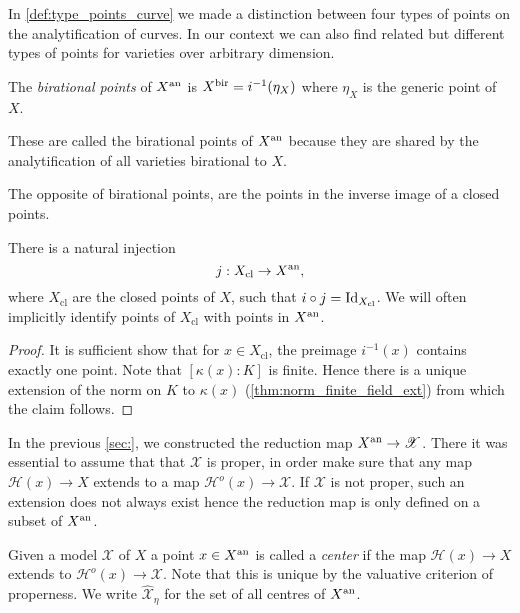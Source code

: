 In \cref{def:type_points_curve} we made a distinction between four types of points on the analytification of curves. 
In our context we can also find related but different types of points for varieties over arbitrary dimension. 

\begin{definition}
	The \emph{birational points} of $X{}^{\text{an}}$ is  $X{}^{\text{bir}} = i ^{-1}(\eta_X)$ where $\eta_X$ is the generic point of $X$. 
\end{definition}
These are called the birational points of $X{}^{\text{an}}$ because they are shared by the analytification of all varieties birational to $X$.

The opposite of birational points, are the points in the inverse image of a closed points. 
\begin{lemma}
	There is a natural injection \[
		j: X_\text{cl}  \to X{}^{\text{an}} 
	,\] 
	where $X_\text{cl} $ are the closed points of $X$, such that $i \circ j = \operatorname{Id} _{X_\text{cl} }$. 
	We will often implicitly identify points of $X_\text{cl} $ with points in $X{}^{\text{an}}$. 
\end{lemma}
\begin{proof}
	It is sufficient show that for $x \in X_\text{cl} $, the preimage $i^{-1}(x)$ contains exactly one point. 
	Note that $[\kappa(x):K]$ is finite. 
	Hence there is a unique extension of the norm on $K$ to $\kappa(x)$ (\cref{thm:norm_finite_field_ext}) from which the claim follows. 
\end{proof}

In the previous \cref{sec:}, we constructed the reduction map $X{}^{\text{an}} \to \mathscr X$. 
There it was essential to assume that that $\mathscr X$ is proper, in order make sure that any map $\mathcal{H} (x) \to X$ extends to a map $\mathcal{H} ^{o}(x) \to \mathscr X$. 
If $\mathscr X$ is not proper, such an extension does not always exist hence the reduction map is only defined on a subset of $X{}^{\text{an}}$. 
\begin{definition}
	Given a model $\mathscr X$ of $X$ a point $x \in X{}^{\text{an}} $ is called a \emph{center} if the map $\mathcal{H} (x) \to X$ extends to $\mathcal{H}^{o} (x) \to \mathscr X$. 
	Note that this is unique by the valuative criterion of properness. 
	We write $\widehat{\mathscr X}_\eta$ for the set of all centres of $X{}^{\text{an}}$. 
\end{definition}

